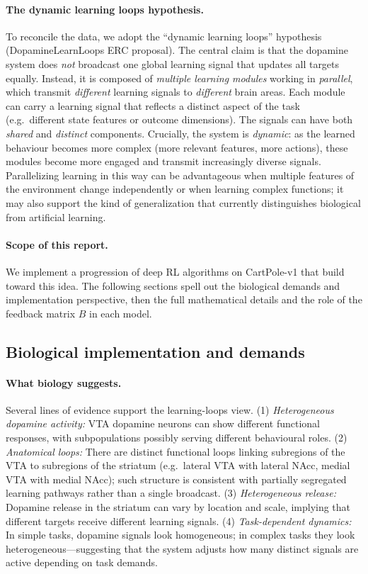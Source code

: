 \documentclass[11pt]{article}
\begin{document}
\paragraph{The dynamic learning loops hypothesis.} To reconcile the data, we adopt the ``dynamic learning loops'' hypothesis (DopamineLearnLoops ERC proposal). The central claim is that the dopamine system does \emph{not} broadcast one global learning signal that updates all targets equally. Instead, it is composed of \emph{multiple learning modules} working in \emph{parallel}, which transmit \emph{different} learning signals to \emph{different} brain areas. Each module can carry a learning signal that reflects a distinct aspect of the task (e.g.\ different state features or outcome dimensions). The signals can have both \emph{shared} and \emph{distinct} components. Crucially, the system is \emph{dynamic}: as the learned behaviour becomes more complex (more relevant features, more actions), these modules become more engaged and transmit increasingly diverse signals. Parallelizing learning in this way can be advantageous when multiple features of the environment change independently or when learning complex functions; it may also support the kind of generalization that currently distinguishes biological from artificial learning.

\paragraph{Scope of this report.} We implement a progression of deep RL algorithms on CartPole-v1 that build toward this idea. The following sections spell out the biological demands and implementation perspective, then the full mathematical details and the role of the feedback matrix $B$ in each model.

\subsection{Biological implementation and demands}

\paragraph{What biology suggests.} Several lines of evidence support the learning-loops view. (1) \emph{Heterogeneous dopamine activity:} VTA dopamine neurons can show different functional responses, with subpopulations possibly serving different behavioural roles. (2) \emph{Anatomical loops:} There are distinct functional loops linking subregions of the VTA to subregions of the striatum (e.g.\ lateral VTA with lateral NAcc, medial VTA with medial NAcc); such structure is consistent with partially segregated learning pathways rather than a single broadcast. (3) \emph{Heterogeneous release:} Dopamine release in the striatum can vary by location and scale, implying that different targets receive different learning signals. (4) \emph{Task-dependent dynamics:} In simple tasks, dopamine signals look homogeneous; in complex tasks they look heterogeneous---suggesting that the system adjusts how many distinct signals are active depending on task demands.
\end{document}
